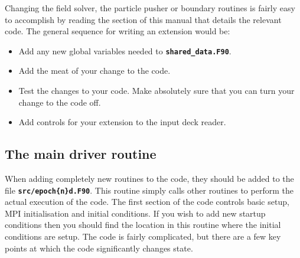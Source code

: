 \documentclass[12pt,a4paper]{article}
\newcommand{\inlinecode}[1]{{\color{warwickred} \bf\texttt{#1}}}
\begin{document}
Changing the field solver, the particle pusher or boundary routines
is fairly easy to accomplish by reading the section of this manual that
details the relevant code. The general sequence for writing an extension
would be:
\begin{itemize}
\item Add any new global variables needed to \inlinecode{shared\_data.F90}.
\item Add the meat of your change to the code.
\item Test the changes to your code. Make absolutely sure that you can turn your
  change to the code off.
\item Add controls for your extension to the input deck reader.
\end{itemize}

\subsection{The main driver routine}
When adding completely new routines to the code, they should be added to the
file \inlinecode{src/epoch\{n\}d.F90}. This routine simply calls other routines
to perform the actual execution of the code. The first section of the code
controls basic setup, MPI initialisation and
initial conditions. If you wish to add new startup conditions then
you should find the location in this routine where the
initial conditions are setup. The code is fairly complicated, but
there are a few key points at which the code significantly changes state.
\end{document}
